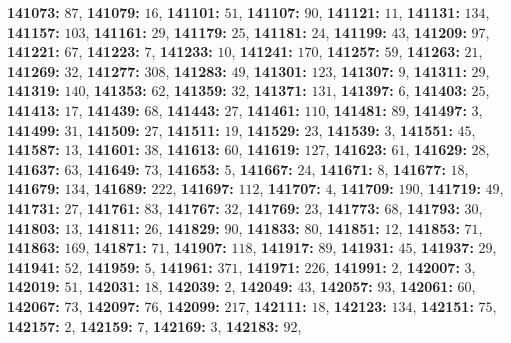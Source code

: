 \textsf{\bfseries 141073:} $87$, \textsf{\bfseries 141079:} $16$, \textsf{\bfseries 141101:} $51$, \textsf{\bfseries 141107:} $90$, \textsf{\bfseries 141121:} $11$, \textsf{\bfseries 141131:} $134$, \textsf{\bfseries 141157:} $103$, \textsf{\bfseries 141161:} $29$, \textsf{\bfseries 141179:} $25$, \textsf{\bfseries 141181:} $24$, \textsf{\bfseries 141199:} $43$, \textsf{\bfseries 141209:} $97$, \textsf{\bfseries 141221:} $67$, \textsf{\bfseries 141223:} $7$, \textsf{\bfseries 141233:} $10$, \textsf{\bfseries 141241:} $170$, \textsf{\bfseries 141257:} $59$, \textsf{\bfseries 141263:} $21$, \textsf{\bfseries 141269:} $32$, \textsf{\bfseries 141277:} $308$, \textsf{\bfseries 141283:} $49$, \textsf{\bfseries 141301:} $123$, \textsf{\bfseries 141307:} $9$, \textsf{\bfseries 141311:} $29$, \textsf{\bfseries 141319:} $140$, \textsf{\bfseries 141353:} $62$, \textsf{\bfseries 141359:} $32$, \textsf{\bfseries 141371:} $131$, \textsf{\bfseries 141397:} $6$, \textsf{\bfseries 141403:} $25$, \textsf{\bfseries 141413:} $17$, \textsf{\bfseries 141439:} $68$, \textsf{\bfseries 141443:} $27$, \textsf{\bfseries 141461:} $110$, \textsf{\bfseries 141481:} $89$, \textsf{\bfseries 141497:} $3$, \textsf{\bfseries 141499:} $31$, \textsf{\bfseries 141509:} $27$, \textsf{\bfseries 141511:} $19$, \textsf{\bfseries 141529:} $23$, \textsf{\bfseries 141539:} $3$, \textsf{\bfseries 141551:} $45$, \textsf{\bfseries 141587:} $13$, \textsf{\bfseries 141601:} $38$, \textsf{\bfseries 141613:} $60$, \textsf{\bfseries 141619:} $127$, \textsf{\bfseries 141623:} $61$, \textsf{\bfseries 141629:} $28$, \textsf{\bfseries 141637:} $63$, \textsf{\bfseries 141649:} $73$, \textsf{\bfseries 141653:} $5$, \textsf{\bfseries 141667:} $24$, \textsf{\bfseries 141671:} $8$, \textsf{\bfseries 141677:} $18$, \textsf{\bfseries 141679:} $134$, \textsf{\bfseries 141689:} $222$, \textsf{\bfseries 141697:} $112$, \textsf{\bfseries 141707:} $4$, \textsf{\bfseries 141709:} $190$, \textsf{\bfseries 141719:} $49$, \textsf{\bfseries 141731:} $27$, \textsf{\bfseries 141761:} $83$, \textsf{\bfseries 141767:} $32$, \textsf{\bfseries 141769:} $23$, \textsf{\bfseries 141773:} $68$, \textsf{\bfseries 141793:} $30$, \textsf{\bfseries 141803:} $13$, \textsf{\bfseries 141811:} $26$, \textsf{\bfseries 141829:} $90$, \textsf{\bfseries 141833:} $80$, \textsf{\bfseries 141851:} $12$, \textsf{\bfseries 141853:} $71$, \textsf{\bfseries 141863:} $169$, \textsf{\bfseries 141871:} $71$, \textsf{\bfseries 141907:} $118$, \textsf{\bfseries 141917:} $89$, \textsf{\bfseries 141931:} $45$, \textsf{\bfseries 141937:} $29$, \textsf{\bfseries 141941:} $52$, \textsf{\bfseries 141959:} $5$, \textsf{\bfseries 141961:} $371$, \textsf{\bfseries 141971:} $226$, \textsf{\bfseries 141991:} $2$, \textsf{\bfseries 142007:} $3$, \textsf{\bfseries 142019:} $51$, \textsf{\bfseries 142031:} $18$, \textsf{\bfseries 142039:} $2$, \textsf{\bfseries 142049:} $43$, \textsf{\bfseries 142057:} $93$, \textsf{\bfseries 142061:} $60$, \textsf{\bfseries 142067:} $73$, \textsf{\bfseries 142097:} $76$, \textsf{\bfseries 142099:} $217$, \textsf{\bfseries 142111:} $18$, \textsf{\bfseries 142123:} $134$, \textsf{\bfseries 142151:} $75$, \textsf{\bfseries 142157:} $2$, \textsf{\bfseries 142159:} $7$, \textsf{\bfseries 142169:} $3$, \textsf{\bfseries 142183:} $92$, 
